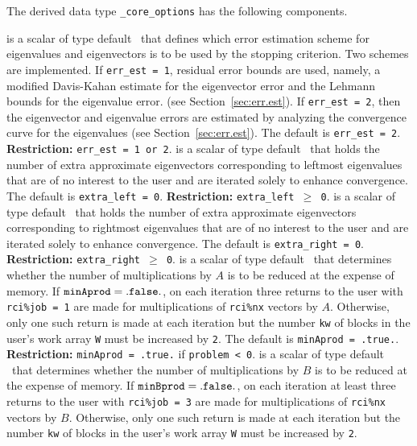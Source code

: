 \label{sec:options}

The derived data type
{\tt \solver\_core\_options}
has the following components.

\begin{description}
%
is a scalar of type default \Integer\ that
defines which error estimation scheme 
for eigenvalues and eigenvectors
is to be used by the stopping criterion.
Two schemes are implemented.
If {\tt err\_est = 1}, residual error bounds are used,
namely,
a modified Davis-Kahan estimate for the eigenvector error
and
the Lehmann bounds for the eigenvalue error.
(see Section~\ref{sec:err.est}).
If {\tt err\_est = 2}, 
then the eigenvector and eigenvalue errors
are estimated by analyzing the convergence curve
for the eigenvalues (see Section~\ref{sec:err.est}).
The default is {\tt err\_est = 2}.
{\bf Restriction:} {\tt err\_est = 1 {\rm or} 2}.
%
is a scalar of type default \Integer\ that
holds the number of extra approximate eigenvectors
corresponding to leftmost eigenvalues
that are of no interest to the user
and are iterated solely to enhance convergence.
The default is {\tt extra\_left = 0}.
{\bf Restriction:} {\tt extra\_left $\ge$ 0}.
%
is a scalar of type default \Integer\ that
holds the number of extra approximate eigenvectors
corresponding to rightmost eigenvalues
that are of no interest to the user
and are iterated solely to enhance convergence.
The default is {\tt extra\_right = 0}.
{\bf Restriction:} {\tt extra\_right $\ge$ 0}.
%
 is a scalar of type default \Logical\ that
determines whether the number of multiplications by $A$ 
is to be reduced at the expense of memory. 
If ${\tt minAprod = .false.}$, 
on each iteration three returns to the user
with {\tt rci\%job = 1} are
made for multiplications of {\tt rci\%nx} vectors by $A$.
Otherwise,  only one such return is made at each iteration but 
the number {\tt kw} of blocks in the user's work array {\tt W} 
must be increased by {\tt 2}.
The default is {\tt minAprod = .true.}.
{\bf Restriction:} {\tt minAprod = .true.} if {\tt problem < 0}.
%
 is a scalar of type default \Logical\ that
determines whether the number of multiplications by $B$ 
is to be reduced at the expense of memory. 
If ${\tt minBprod = .false.}$, 
on each iteration at least three returns to the user
with {\tt rci\%job = 3} are
made for multiplications of {\tt rci\%nx} vectors by $B$.
Otherwise,  only one such return is made at each iteration but 
the number {\tt kw} of blocks in the user's work array {\tt W} 
must be increased by {\tt 2}.

\end{description}

